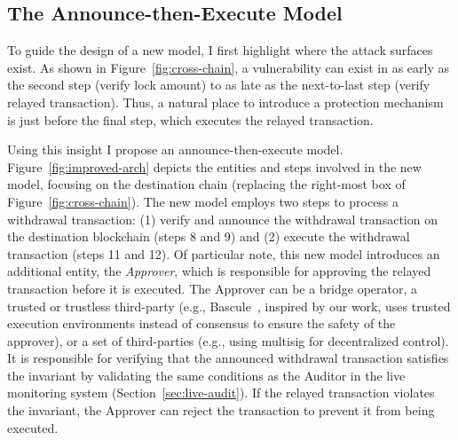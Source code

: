 \subsection{The Announce-then-Execute Model}

To guide the design of a new model, I first highlight where the
attack surfaces exist. As shown in Figure~\ref{fig:cross-chain}, a
vulnerability can exist in as early as the second step (verify lock
amount) to as late as the next-to-last step (verify relayed
transaction). Thus, a natural place to introduce a protection
mechanism is just before the final step, which executes the relayed
transaction.

Using this insight I propose an announce-then-execute model.
Figure~\ref{fig:improved-arch} depicts the entities and steps involved
in the new model, focusing on the destination chain (replacing the
right-most box of Figure~\ref{fig:cross-chain}).  The new model
employs two steps to process a withdrawal transaction: (1) verify and
announce the withdrawal transaction on the destination blockchain (steps
8 and 9) and (2) execute the withdrawal transaction (steps 11 and
12). Of particular note, this new model introduces an additional
entity, the \emph{Approver}, which is responsible for approving the
relayed transaction before it is executed.  The Approver can be a bridge
operator, a trusted or trustless third-party (e.g., Bascule~\cite{bascule},
inspired by our work, uses trusted execution environments instead of consensus to ensure the safety of the approver), or a set of
third-parties (e.g., using
multisig for decentralized control). It is responsible for
verifying that the announced withdrawal transaction satisfies the
invariant by validating the same conditions as the Auditor in the live
monitoring system (Section~\ref{sec:live-audit}).  If the relayed
transaction violates the invariant, the Approver can reject the
transaction to prevent it from being executed.



